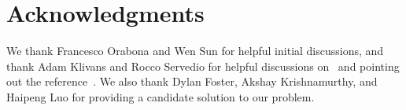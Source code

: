 \documentclass{article}
\begin{document}








\section*{Acknowledgments} We thank Francesco Orabona and Wen Sun
for helpful initial discussions, and thank Adam Klivans and Rocco Servedio for helpful
discussions on~\citep{Klivans-Servedio-2008} and
pointing out the reference~\citep{Klivans-Servedio-2004}. We also thank Dylan Foster, 
Akshay Krishnamurthy, and Haipeng Luo for providing a candidate solution to our problem. 


%




\onecolumn
\appendix
\clearpage












\end{document}
